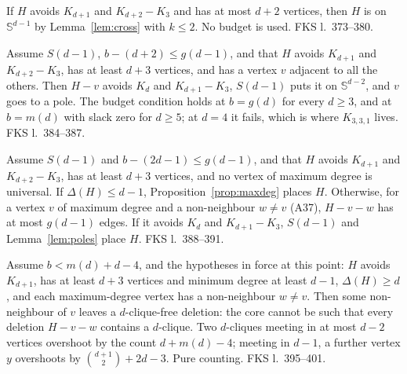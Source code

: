 \begin{lemma}
  \label{lem:branch-C-small}
  \leanok
  If $H$ avoids $K_{d+1}$ and $K_{d+2} - K_3$ and has at most $d + 2$ vertices, then $H$ is
  on $\mathbb{S}^{d-1}$ by Lemma~\ref{lem:cross} with $k \le 2$. No budget is used.
  FKS l.~373--380.
\end{lemma}

\begin{lemma}
  \label{lem:branch-C-universal}
  \leanok
  Assume $S(d-1)$, $b - (d + 2) \le g(d-1)$, and that $H$ avoids $K_{d+1}$ and
  $K_{d+2} - K_3$, has at least $d + 3$ vertices, and has a vertex $v$ adjacent to all the
  others. Then $H - v$ avoids $K_d$ and $K_{d+1} - K_3$, $S(d-1)$ puts it on
  $\mathbb{S}^{d-2}$, and $v$ goes to a pole. The budget condition holds at $b = g(d)$ for
  every $d \ge 3$, and at $b = m(d)$ with slack zero for $d \ge 5$; at $d = 4$ it fails,
  which is where $K_{3,3,1}$ lives. FKS l.~384--387.
\end{lemma}

\begin{lemma}
  \label{lem:branch-C-poles}
  \leanok
  Assume $S(d-1)$ and $b - (2d - 1) \le g(d-1)$, and that $H$ avoids $K_{d+1}$ and
  $K_{d+2} - K_3$, has at least $d + 3$ vertices, and no vertex of maximum degree is
  universal. If $\Delta(H) \le d - 1$, Proposition~\ref{prop:maxdeg} places $H$. Otherwise,
  for a vertex $v$ of maximum degree and a non-neighbour $w \ne v$ (A37), $H - v - w$ has at
  most $g(d-1)$ edges. If it avoids $K_d$ and $K_{d+1} - K_3$, $S(d-1)$ and
  Lemma~\ref{lem:poles} place $H$. FKS l.~388--391.
\end{lemma}

\begin{lemma}
  \label{lem:case1}
  \leanok
  Assume $b < m(d) + d - 4$, and the hypotheses in force at this point: $H$ avoids
  $K_{d+1}$, has at least $d + 3$ vertices and minimum degree at least $d - 1$,
  $\Delta(H) \ge d$, and each maximum-degree vertex has a non-neighbour $w \ne v$. Then some
  non-neighbour of $v$ leaves a $d$-clique-free deletion: the core cannot be such that every
  deletion $H - v - w$ contains a $d$-clique. Two $d$-cliques meeting in at most $d - 2$
  vertices overshoot by the count $d + m(d) - 4$; meeting in $d - 1$, a further vertex $y$
  overshoots by $\binom{d+1}{2} + 2d - 3$. Pure counting. FKS l.~395--401.
\end{lemma}

